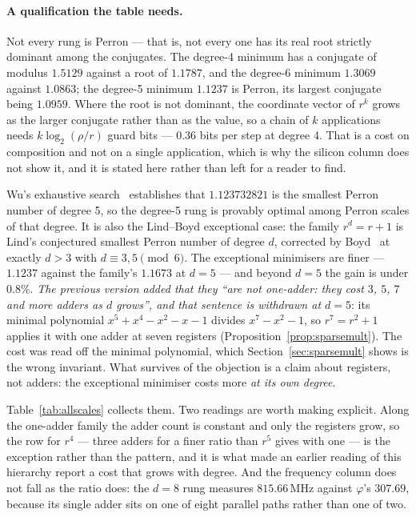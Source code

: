 \documentclass[11pt]{article}
\theoremstyle{definition}
\begin{document}
\paragraph{A qualification the table needs.} Not every rung is Perron --- that
is, not every one has its real root strictly dominant among the conjugates. The
degree-4 minimum has a conjugate of modulus $1.5129$ against a root of
$1.1787$, and the degree-6 minimum $1.3069$ against $1.0863$; the degree-5
minimum $1.1237$ is Perron, its largest conjugate being $1.0959$. Where the
root is not dominant, the coordinate vector of $r^{k}$ grows as the larger
conjugate rather than as the value, so a chain of $k$ applications needs
$k\log_2(\rho/r)$ guard bits --- $0.36$ bits per step at degree 4. That is a cost
on composition and not on a single application, which is why the silicon column
does not show it, and it is stated here rather than left for a reader to find.

Wu's exhaustive search~\cite{wu2010} establishes that $1.123732821$ is the
smallest Perron number of degree 5, so the degree-5 rung is provably optimal
among Perron scales of that degree. It is also the Lind--Boyd exceptional case:
the family $r^d=r+1$ is Lind's conjectured smallest Perron number of degree $d$,
corrected by Boyd~\cite{boyd1985} at exactly $d>3$ with $d\equiv3,5 \pmod 6$. The
exceptional minimisers are finer --- $1.1237$ against the family's $1.1673$ at
$d=5$ --- and beyond $d=5$ the gain is under $0.8\%$. \emph{The previous version
added that they ``are not one-adder: they cost $3$, $5$, $7$ and more adders as
$d$ grows'', and that sentence is withdrawn at $d=5$}: its minimal polynomial
$x^5+x^4-x^2-x-1$ divides $x^7-x^2-1$, so $r^{7}=r^{2}+1$ applies it with one
adder at seven registers (Proposition~\ref{prop:sparsemult}). The cost was read
off the minimal polynomial, which Section~\ref{sec:sparsemult} shows is the wrong
invariant. What survives of the objection is a claim about registers, not
adders: the exceptional minimiser costs more \emph{at its own degree}.

Table~\ref{tab:allscales} collects them. Two readings are worth making
explicit. Along the one-adder family the adder count is constant and only the
registers grow, so the row for $r^4$ --- three adders for a finer ratio than
$r^5$ gives with one --- is the exception rather than the pattern, and it is what
made an earlier reading of this hierarchy report a cost that grows with degree.
And the frequency column does not fall as the ratio does: the $d=8$ rung
measures $815.66$\,MHz against $\varphi$'s $307.69$, because its single adder
sits on one of eight parallel paths rather than one of two.
\end{document}
